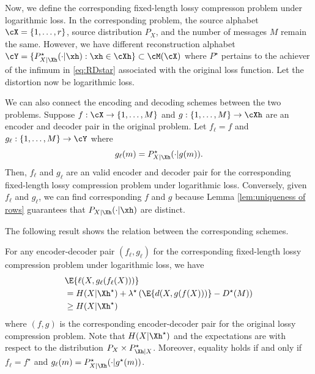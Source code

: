 \documentclass[draftclsnofoot, onecolumn, letterpaper, romanappendices]{IEEEtran}
\begin{document}
Now, we define the corresponding fixed-length lossy compresson problem under logarithmic loss.
In the corresponding problem, the source alphabet $\cX = \{1,\ldots, r\}$, source distribution $P_X$,
and the number of messages $M$ remain the same.
However, we have different reconstruction alphabet
$\cY = \{P_{X|\Xh}^{\star}(\cdot|\xh):\xh\in\cXh\}\subset \cM(\cX)$
where $P^\star$ pertains to the achiever of the infimum in \eqref{eq:RDstar}
associated with the original loss function.
Let the distortion now be logarithmic loss.

We can also connect the encoding and decoding schemes between the two problems.
Suppose $f:\cX\rightarrow \{1,\ldots,M\}$ and $g:\{1,\ldots,M\}\rightarrow \cXh$ are an encoder
and decoder pair in the original problem.
Let $f_{\ell} = f$ and $g_{\ell}:\{1,\ldots,M\}\rightarrow \cY$ where
\begin{align*}
    g_{\ell}(m) = P_{X|\Xh}^\star(\cdot|g(m)).
\end{align*}
Then, $f_{\ell}$ and $g_{\ell}$ are an valid encoder and decoder pair for the
corresponding fixed-length lossy compression problem under logarithmic loss.
Conversely, given $f_{\ell}$ and $g_{\ell}$, we can find corresponding $f$ and $g$ because
Lemma \ref{lem:uniqueness of rows} guarantees that $P_{X|\Xh}(\cdot|\xh)$ are distinct.

The following result shows the relation between the corresponding schemes.
\begin{theorem}\label{thm:correspondence}
    For any encoder-decoder pair $(f_{\ell},g_{\ell})$ for the corresponding fixed-length lossy compression problem
    under logarithmic loss, we have
    \begin{align*}
        &\E{\ell(X,g_{\ell}(f_{\ell}(X)))}\nonumber\\
        &= H(X|\Xh^{\star}) + \lambda^{\star}\left(\E{d(X,g(f(X)))}-D^{\star}(M)\right)\nonumber\\
        &\geq H(X|\Xh^{\star})
    \end{align*}
    where $(f,g)$ is the corresponding encoder-decoder pair
    for the original lossy compression problem.
    Note that $H(X|\Xh^{\star})$ and the expectations are with respect to
    the distribution $P_X \times P_{\Xh|X}^\star$.
    Moreover, equality holds if and only if
    $f_\ell = f^\star$ and $g_\ell(m) = P_{X|\Xh}^\star(\cdot|g^\star(m))$.
\end{theorem}
\end{document}

